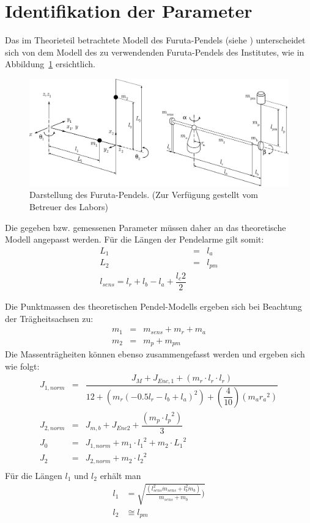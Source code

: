 \section{Identifikation der Parameter}
\label{sec.Parameter}
Das im Theorieteil betrachtete Modell des Furuta-Pendels (siehe \cite{Cazzolato.2011}) unterscheidet sich von dem Modell des zu verwendenden Furuta-Pendels des Institutes, wie in Abbildung~\ref{fig.FurutaPlant} ersichtlich.

\begin{figure}[htbp]
	\centering
	\includegraphics[width=1.\textwidth]{Grafiken/adelaideimagenew}
	\caption{Darstellung des Furuta-Pendels. (Zur Verfügung gestellt vom Betreuer des Labors) }
	\label{fig.FurutaPlant}
\end{figure}

Die gegeben bzw. gemessenen Parameter müssen daher an das theoretische Modell angepasst werden. Für die Längen der Pendelarme gilt somit:
\begin{eqnarray}
L_1 &=& l_a \nonumber \\
L_2 &=& l_{pm} \nonumber \\
l_{sens}=l_r+l_b-l_a+\dfrac{l_c2}{2}
\end{eqnarray}


Die Punktmassen des theoretischen Pendel-Modells ergeben sich bei Beachtung der Trägheitsachsen zu:
\begin{eqnarray}
m_1 &=& m_{sens}+m_r+m_a \nonumber \\
m_2 &=& m_p+m_{pm}
\end{eqnarray}
Die Massenträgheiten können ebenso zusammengefasst werden und ergeben sich wie folgt:
\begin{eqnarray*}
J_{1,norm}&=&\dfrac{J_M +J_{Enc,1}+(m_r \cdot l_r \cdot l_r)}{12+(m_r (-0.5 l_r-l_b+l_a)^2)+(\dfrac{4}{10}) (m_a  {r_a}^{2})} \\
J_{2,norm}&=& J_{m,b}+J_{Enc2}   + \dfrac{(m_p \cdot {l_p}^{2})}{3} \\
J_0&=&J_{1,norm}+ m_1 \cdot {l_1}^{2} + m_2 \cdot {L_1}^{2} \\ 
J_2&=&J_{2,norm}+m_2 \cdot {l_2}^2           \\
\end{eqnarray*}
Für die Längen $l_1$ und $l_2$ erhält man
\begin{align*}
l_1 &= \sqrt{\frac{(l_{sens}^2 \dot m_{sens}+l_b^2 \dot m_b)}{m_{sens} + m_b})} \\
l_2 &\cong l_{pm}
\end{align*}

